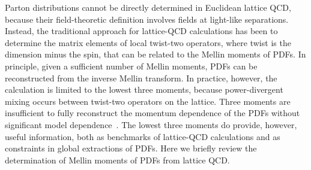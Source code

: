 Parton distributions cannot be directly determined in Euclidean lattice QCD, 
because their field-theoretic definition involves fields at light-like 
separations.
%
Instead, the traditional approach for lattice-QCD calculations has been to 
determine the matrix elements of local twist-two operators, where twist is the 
dimension minus the spin, that can be related to the Mellin moments of PDFs.
%
In principle, given a sufficient number of Mellin moments, PDFs can be 
reconstructed from the inverse Mellin transform. In practice, however, 
the calculation is limited to the lowest three moments, because power-divergent 
mixing occurs between twist-two operators on the lattice.
%
Three moments are insufficient to fully reconstruct the momentum dependence of 
the PDFs without significant model dependence~\cite{Detmold:2003rq}.
%
The lowest three moments do provide, however, useful information, both as 
benchmarks of lattice-QCD calculations and as constraints in global extractions 
of PDFs. 
%
Here we briefly review the determination of Mellin moments of PDFs from lattice 
QCD. 

